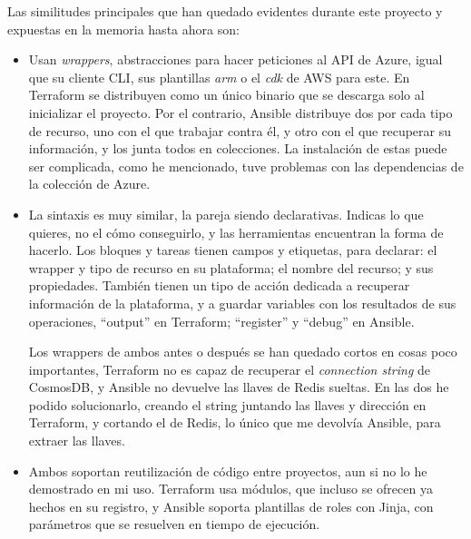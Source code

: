 \documentclass[11pt]{article}
\begin{document}
\begin{flushleft}
\clearpage
Las similitudes principales que han quedado evidentes durante este proyecto y expuestas en la memoria hasta ahora son:
\skip
        \begin{itemize}
			\itemsep0em 
			\item Usan \textit{\gls{wrapper}s}, abstracciones para hacer peticiones al API de Azure, igual que su cliente CLI, sus plantillas \textit{\acrshort{arm}} o el \textit{\acrshort{cdk}} de AWS para este. En Terraform se distribuyen como un único binario que se descarga solo al inicializar el proyecto. Por el contrario, Ansible distribuye dos por cada tipo de recurso, uno con el que trabajar contra él, y otro con el que recuperar su información, y los junta todos en colecciones. La instalación de estas puede ser complicada, como he mencionado, tuve problemas con las dependencias de la colección de Azure.
            \linebreak
            
			\item La sintaxis es muy similar, la pareja siendo declarativas. Indicas lo que quieres, no el cómo conseguirlo, y las herramientas encuentran la forma de hacerlo. Los bloques y tareas tienen campos y etiquetas, para declarar: el wrapper y tipo de recurso en su plataforma; el nombre del recurso; y sus propiedades. También tienen un tipo de acción dedicada a recuperar información de la plataforma, y a guardar variables con los resultados de sus operaciones, ``output'' en Terraform; ``register'' y ``debug'' en Ansible.
            \linebreak
            
            Los wrappers de ambos antes o después se han quedado cortos en cosas poco importantes, Terraform no es capaz de recuperar el \textit{connection string} de CosmosDB, y Ansible no devuelve las llaves de Redis sueltas. En las dos he podido solucionarlo, creando el string juntando las llaves y dirección en Terraform, y cortando el de Redis, lo único que me devolvía Ansible, para extraer las llaves.
            \linebreak
            
			\item Ambos soportan reutilización de código entre proyectos, aun si no lo he demostrado en mi uso. Terraform usa módulos, que incluso se ofrecen ya hechos en su registro, y Ansible soporta plantillas de roles con Jinja, con parámetros que se resuelven en tiempo de ejecución.
            \linebreak
   

\end{itemize}
\end{flushleft}
\end{document}
